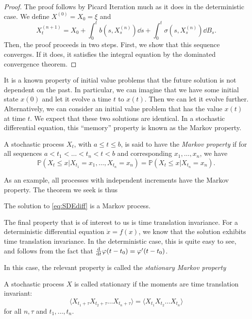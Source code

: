 \documentclass[prb,12pt]{revtex4-2}
\theoremstyle{definition}
\theoremstyle{definition}
\theoremstyle{definition}
\begin{document}
\begin{proof}
	The proof follows by Picard Iteration much as it does in the deterministic case. We define $X^{(0)}=X_0=\xi$ and
	\[
	X_t^{(n+1)}=X_0+\int_0^t b(s, X_s^{(n)})\dd{s}+\int_0^t \sigma(s, X_s^{(n)})\dd{B_s}
	.\] 
	Then, the proof proceeds in two steps. First, we show that this sequence converges. If it does, it satisfies the integral equation by the dominated convergence theorem. 
\end{proof}
It is a known property of initial value problems that the future solution is not dependent on the past. In particular, we can imagine that we have some initial state $x(0)$ and let it evolve a time $t$ to $x(t)$. Then we can let it evolve further. Alternatively, we can consider an initial value problem that has the value $x(t)$ at time $t$. We expect that these two solutions are identical. In a stochastic differential equation, this ``memory'' property is known as the Markov property. 
\begin{Definition}
	A stochastic process $X_t$, with $a\le t \le b$, is said to have the \emph{Markov property} if for all sequences $a < t_1 < \dots < t_n < t < b$ and corresponding $x_1, \dots, x_n$, we have
	\[
	\mathbb{P}(X_t\le x|X_{t_1}=x_1, \dots, X_{t_n}=x_n) = \mathbb{P}(X_t\le x|X_{t_n}=x_n)
	.\] 
\end{Definition}
As an example, all processes with independent increments have the Markov property. The theorem we seek is thus

\begin{Theorem}
	The solution to \eqref{eq:SDEdiff} is a Markov process.
\end{Theorem}

The final property that is of interest to us is time translation invariance. For a deterministic differential equation $\dot{x} = f(x)$, we know that the solution exhibits time translation invariance. In the deterministic case, this is quite easy to see, and follows from the fact that $\dv{t}\varphi(t - t_0) = \varphi'(t-t_0)$. 

In this case, the relevant property is called the \emph{stationary Markov property}
\begin{Definition}
	A stochastic process $X$ is called stationary if the moments are time translation invariant:
	\[
	\langle X_{t_1+\tau}X_{t_2+\tau}\dots X_{t_n+\tau}\rangle = \langle X_{t_1}X_{t_2}\dots X_{t_n}\rangle
	\]
	for all $n,\tau$ and $t_1, \dots, t_n$.
\end{Definition}
\end{document}
